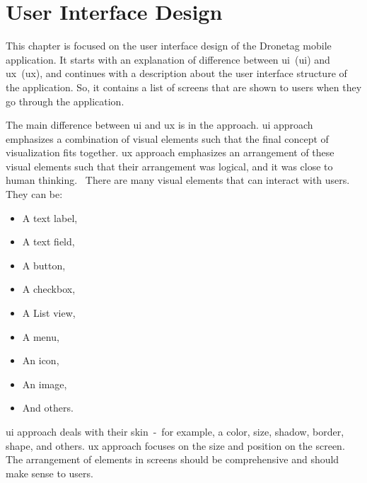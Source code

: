 \chapter{User Interface Design}\label{ch:user-interface-design}
This chapter is focused on the user interface design of the Dronetag mobile application.
It starts with an explanation of difference between \acrshort{ui}~(\acrlong{ui}) and \acrshort{ux}~(\acrlong{ux}), and continues with a description about the user interface structure of the application.
So, it contains a list of screens that are shown to users when they go through the application.

The main difference between \acrshort{ui} and \acrshort{ux} is in the approach.
\acrshort{ui} approach emphasizes a combination of visual elements such that the final concept of visualization fits together.
\acrshort{ux} approach emphasizes an arrangement of these visual elements such that their arrangement was logical, and it was close to human thinking.~\cite{prototyping}
There are many visual elements that can interact with users.
They can be:
\begin{itemize}
    \item A text label,
    \item A text field,
    \item A button,
    \item A checkbox,
    \item A List view,
    \item A menu,
    \item An icon,
    \item An image,
    \item And others.
\end{itemize}
\acrshort{ui} approach deals with their skin~-~for example, a color, size, shadow, border, shape, and others.
\acrshort{ux} approach focuses on the size and position on the screen.
The arrangement of elements in screens should be comprehensive and should make sense to users.

